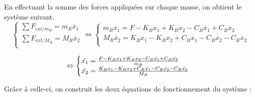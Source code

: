 \documentclass[a4paper,12pt]{article}
\begin{document}
    En effectuant la somme des forces appliquées sur chaque masse, on obtient le système suivant.
    \[
        \begin{cases}
            \sum F_{ext/m_R} = m_R\ddot{x_1} \\
            \sum F_{ext/M_R} = M_R\ddot{x_2} \\
        \end{cases}
        \Leftrightarrow
        \begin{cases}
            m_R\ddot{x_1} = F - K_B x_1 + K_B x_2 - C_B \dot{x_1} + C_B\dot{x_2} \\
            M_R\ddot{x_2} = K_B x_1 - K_B x_2 + C_B \dot{x_1} - C_B\dot{x_2} - C_R \dot{x_2} \\
        \end{cases}
    \]
    
    \begin{equation}
        \\ \Leftrightarrow
        \begin{cases}
            \ddot{x_1} = \frac{F - K_B x_1 + K_B x_2 - C_B \dot{x_1} + C_B \dot{x_2}}{m_R} \\
            \ddot{x_2} = \frac{K_B x_1 - K_B x_2 + C_B \dot{x_1} - C_B \dot{x_2} - C_R \dot{x_2}}{M_R}
        \end{cases}
        \label{eq:SommeDesForces}
    \end{equation}
    
    Grâce à celle-ci, on construit les deux équations de fonctionnement du système :
    
\end{document}
